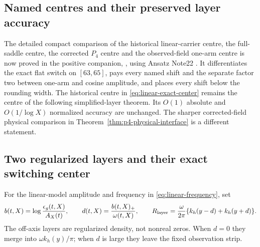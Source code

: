 \subsection{Named centres and their preserved layer accuracy}
The detailed compact comparison of the historical linear-carrier centre,
the full-saddle centre, the corrected $P_4$ centre and the observed-field
one-arm centre is now proved in the positive companion,
, using Ansatz Note22 \cite{an22}.
It differentiates the exact flat switch on $[63,65]$, pays every named
shift and the separate factor two between one-arm and cosine amplitude,
and places every shift below the rounding width. The historical centre
in \eqref{eq:linear-exact-center} remains the centre of the following
simplified-layer theorem. Its $O(1)$ absolute and $O(1/\log X)$ normalized
accuracy are unchanged. The sharper corrected-field physical comparison
in Theorem~\ref{thm:p4-physical-interface} is a different statement.

\subsection{Two regularized layers and their exact switching center}
For the linear-model amplitude and frequency in
\eqref{eq:linear-frequency}, set
\begin{equation}
 b(t,X)=\log\frac{\epsilon_g(t,X)}{A_X(t)},\qquad
 d(t,X)=\frac{b(t,X)_+}{\omega(t,X)},\qquad
 R_{\rm layer}=\frac\omega{2\pi}
       \{k_h(y-d)+k_h(y+d)\}.
 \label{eq:linear-layer}
\end{equation}
The off-axis layers are regularized density, not nonreal zeros.
When $d=0$ they merge into $\omega k_h(y)/\pi$; when $d$ is large
they leave the fixed observation strip.

